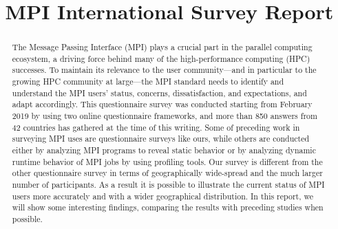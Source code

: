 \documentclass[conference,10pt,letterpaper]{IEEEtran}
\begin{document}
\title{MPI International Survey Report}

\author{
  \and
  \and
  \and
  \and
  \and
  \and
}  

\maketitle

\begin{abstract}
The Message Passing Interface (MPI) plays a crucial part in the
parallel computing ecosystem, a driving force behind many of the
high-performance computing (HPC) successes. To maintain its relevance
to the user community---and in particular to the growing HPC community
at large---the MPI standard needs to identify and understand the MPI
users' status, concerns, dissatisfaction, and expectations, and adapt
accordingly. This questionnaire survey was conducted starting from February
2019 by using two online questionnaire frameworks, and more than 850
answers from 42 countries has gathered at the time of this writing. 
Some of preceding work in surveying MPI uses are questionnaire surveys
like ours, while others are conducted either by analyzing MPI programs
to reveal static behavior or by analyzing dynamic runtime behavior of
MPI jobs by using profiling tools. Our survey is different from the
other questionnaire survey in terms of geographically wide-spread and
the much larger number of participants. As a result it is possible to
illustrate the current status of MPI users more accurately and with a
wider geographical distribution. In this report, we will show some
interesting findings, comparing the results with preceding studies
when possible.
\end{abstract}
\end{document}
